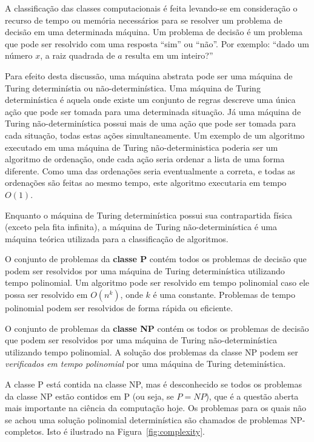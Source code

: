 \documentclass[a4paper,twocolumn]{article}
\begin{document}
A classificação das classes computacionais é feita levando-se em consideração o recurso de tempo ou memória necessários para se resolver um problema de decisão em uma determinada máquina. Um problema de decisão é um problema que pode ser resolvido com uma resposta ``sim'' ou ``não''. Por exemplo: ``dado um número $x$, a raiz quadrada de $a$ resulta em um inteiro?''

Para efeito desta discussão, uma máquina abstrata pode ser uma máquina de Turing determinístia ou não-determinística. Uma máquina de Turing determinística é aquela onde existe um conjunto de regras descreve uma única ação que pode ser tomada para uma determinada situação. Já uma máquina de Turing não-determinística possui mais de uma ação que pode ser tomada para cada situação, todas estas ações simultaneamente. Um exemplo de um algoritmo executado em uma máquina de Turing não-deterministica poderia ser um algoritmo de ordenação, onde cada ação seria ordenar a lista de uma forma diferente. Como uma das ordenações seria eventualmente a correta, e todas as ordenações são feitas ao mesmo tempo, este algoritmo executaria em tempo $O(1)$.

Enquanto o máquina de Turing determinística possui sua contrapartida física (exceto pela fita infinita), a máquina de Turing não-determinística é uma máquina teórica utilizada para a classificação de algoritmos.

O conjunto de problemas da \textbf{classe P} contém todos os problemas de decisão que podem ser resolvidos por uma máquina de Turing determinística utilizando tempo polinomial. Um algoritmo pode ser resolvido em tempo polinomial caso ele possa ser resolvido em $O(n^k)$, onde $k$ é uma constante. Problemas de tempo polinomial podem ser resolvidos de forma rápida ou eficiente.

O conjunto de problemas da \textbf{classe NP} contém os todos os problemas de decisão que podem ser resolvidos por uma máquina de Turing não-determinística utilizando tempo polinomial. A solução dos problemas da classe NP podem ser \emph{verificados em tempo polinomial} por uma máquina de Turing deteminística. 

A classe P está contida na classe NP, mas é desconhecido se todos os problemas da classe NP estão contidos em P (ou seja, se $P=NP$), que é a questão aberta mais importante na ciência da computação hoje. Os problemas para os quais não se achou uma solução polinomial determinística são chamados de problemas NP-completos. Isto é ilustrado na Figura~\ref{fig:complexity}.
\end{document}
